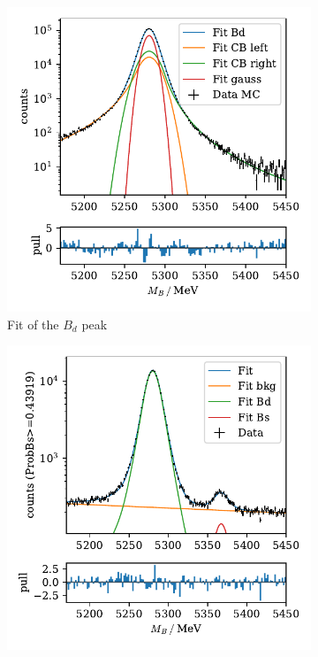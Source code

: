 \begin{figure}
    \centering
    \begin{subfigure}{0.5\textwidth}
        \centering
        \includegraphics[width=\textwidth]{images/fit_mc.pdf}
        \caption{Fit of the $B_d$ peak}
        \label{fig:fit_mc}
    \end{subfigure}%
    \begin{subfigure}{0.5\textwidth}
        \centering
        \includegraphics[width=\textwidth]{images/fit_example.pdf}

\end{subfigure}
\end{figure}
